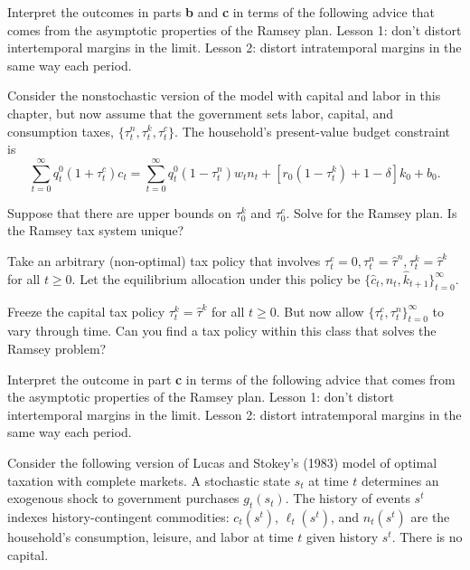 \medskip
{} Interpret the outcomes in parts {\bf b} and {\bf c} in terms of the following advice that comes from the asymptotic properties
of the Ramsey plan. Lesson 1: don't distort intertemporal margins in the limit.  Lesson 2: distort intratemporal margins in the same way each period.



\medskip

\medskip
{}

\medskip
\noindent
Consider the nonstochastic version of the  model with capital and labor in this
chapter, but now assume that the
government sets labor, capital, and consumption taxes, $\{\tau^n_t, \tau^k_t, \tau^c_t\}$.
The household's present-value budget constraint is
$$
\sum_{t=0}^\infty q^0_t (1+\tau^c_t) c_t =
\sum_{t=0}^\infty q^0_t (1-\tau^n_t) w_t n_t
   + \left[r_{0}(1-\tau^k_t) + 1-\delta \right] k_0 + b_0.
$$

\medskip
{} Suppose that there are upper bounds on $\tau^k_0$ and $\tau^c_0$. Solve for the Ramsey plan.  Is the Ramsey tax system
unique?

\medskip
{} Take an arbitrary (non-optimal) tax policy that involves $\tau^c_t = 0, \tau^n_t = \hat \tau^n, \tau^k_t = \hat \tau^k$
for all $t \geq 0$.  Let the equilibrium allocation under this policy be $\{\hat c_t, \hat n_t, \hat k_{t+1}\}_{t=0}^\infty$.


\medskip
{} Freeze the capital tax policy $\tau^k_t = \hat \tau^k$ for all $t \geq 0$.  But now allow $\{\tau^c_t, \tau^n_t\}_{t=0}^\infty$
to vary through time.  Can you find a tax policy within this class that solves the Ramsey problem?


\medskip
{} Interpret the outcome in part  {\bf c} in terms of the following advice that comes from the asymptotic properties
of the Ramsey plan. Lesson 1: don't distort intertemporal margins in the limit.  Lesson 2: distort intratemporal margins in the same way each period.


\medskip
{}

\medskip
\noindent Consider the following version of Lucas and Stokey's (1983) model
of optimal taxation with complete markets.  A stochastic state $s_t$ at time $t$ determines
an exogenous shock to government purchases $g_t(s_t)$. The history of events
$s^t$ indexes history-contingent commodities:
 $c_t(s^t)$, $\ell_t(s^t)$, and $n_t(s^t)$ are the
household's consumption, leisure, and labor at time $t$ given history
$s^t$. There is no capital. %

